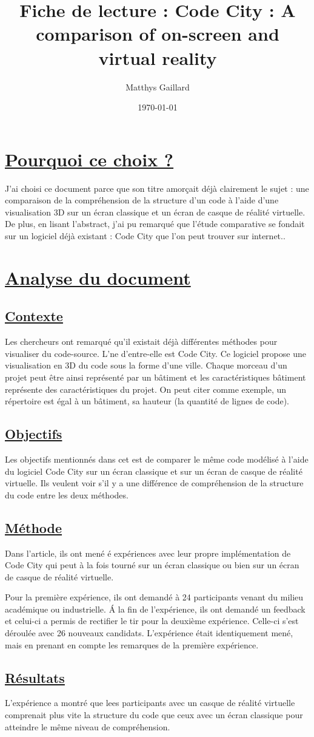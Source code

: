 \documentclass[a4paper,10pt, oneside]{article}
\title{Fiche de lecture : Code City : A comparison of on-screen and virtual reality}
\author{Matthys Gaillard}
\date{\today}
\begin{document}
\maketitle
\section{\ul{Pourquoi ce choix ?}}
		\par J'ai choisi ce document\cite{A1} parce que son titre amorçait déjà clairement le sujet : une comparaison de la compréhension de la 
		structure d'un code à l'aide d'une visualisation 3D sur un écran classique et un écran de casque de réalité virtuelle. De plus, en lisant l'abstract,
		j'ai pu remarqué que l'étude comparative se fondait sur un logiciel déjà existant : Code City que l'on peut trouver sur internet..
\section{\ul{Analyse du document}}
\subsection{\ul{Contexte}}
		\par Les chercheurs ont remarqué qu'il existait déjà différentes méthodes pour visualiser du code-source. L'ne d'entre-elle est Code City. Ce logiciel
		propose une visualisation en 3D du code sous la forme d'une ville. Chaque morceau d'un projet peut être ainsi représenté par un bâtiment et les caractéristiques
		bâtiment représente des caractéristiques du projet. On peut citer comme exemple, un répertoire est égal à un bâtiment, sa hauteur (la quantité de lignes de code).
\subsection{\ul{Objectifs}}
		\par Les objectifs mentionnés dans cet est de comparer le même code modélisé à l'aide du logiciel Code City sur un écran classique et sur un écran de casque de réalité virtuelle.
		Ils veulent voir s'il y a une différence de compréhension de la structure du code entre les deux méthodes.
\subsection{\ul{Méthode}}
		\par Dans l'article, ils ont mené é expériences avec leur propre implémentation de Code City qui peut à la fois tourné sur un écran classique ou bien sur un écran de casque de réalité virtuelle.
		\par Pour la première expérience, ils ont demandé à 24 participants venant du milieu académique ou industrielle. Á la fin de l'expérience, ils ont demandé un feedback et celui-ci a permis de rectifier le tir 
		pour la deuxième expérience. Celle-ci s'est déroulée avec 26 nouveaux candidats. L'expérience était identiquement mené, mais en prenant en compte les remarques de la première expérience.
\subsection{\ul{Résultats}}
		\par L'expérience a montré que lees participants avec un casque de réalité virtuelle comprenait plus vite la structure du code que ceux avec un écran classique pour atteindre le même niveau de compréhension. 
\end{document}
